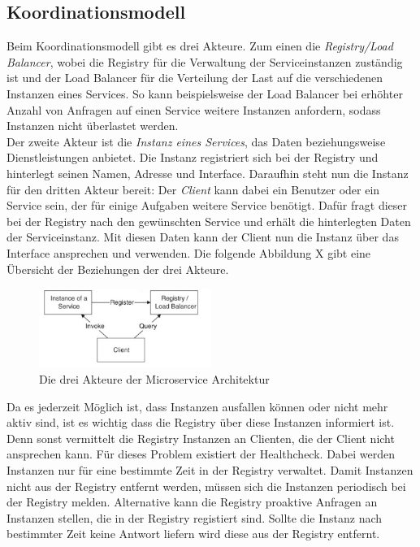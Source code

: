 \subsection{Koordinationsmodell}

Beim Koordinationsmodell gibt es drei Akteure. Zum einen die \textit{Registry/Load Balancer}, wobei die Registry für die Verwaltung der Serviceinstanzen zuständig ist und der Load Balancer für die Verteilung der Last auf die verschiedenen Instanzen eines Services. So kann beispielsweise der Load Balancer bei erhöhter Anzahl von Anfragen auf einen Service weitere Instanzen anfordern, sodass Instanzen nicht überlastet werden.\\
Der zweite Akteur ist die \textit{Instanz eines Services}, das Daten beziehungsweise Dienstleistungen anbietet. Die Instanz registriert sich bei der Registry und hinterlegt seinen Namen, Adresse und Interface. Daraufhin steht nun die Instanz für den dritten Akteur bereit: Der \textit{Client} kann dabei ein Benutzer oder ein Service sein, der für einige Aufgaben weitere Service benötigt. Dafür fragt dieser bei der Registry nach den gewünschten Service und erhält die hinterlegten Daten der Serviceinstanz. Mit diesen Daten kann der Client nun die Instanz über das Interface ansprechen und verwenden. Die folgende Abbildung X gibt eine Übersicht der Beziehungen der drei Akteure.

\begin{figure}[htbp]
  \centering
  \includegraphics[width=0.5\textwidth]{pictures/3akteure.png}
	\caption{Die drei Akteure der Microservice Architektur}
	\label{bService}
\end{figure}

Da es jederzeit Möglich ist, dass Instanzen ausfallen können oder nicht mehr aktiv sind, ist es wichtig dass die Registry über diese Instanzen informiert ist. Denn sonst vermittelt die Registry Instanzen an Clienten, die der Client nicht ansprechen kann. Für dieses Problem existiert der Healthcheck. Dabei werden Instanzen nur für eine bestimmte Zeit in der Registry verwaltet. Damit Instanzen nicht aus der Registry entfernt werden, müssen sich die Instanzen periodisch bei der Registry melden. Alternative kann die Registry proaktive Anfragen an Instanzen stellen, die in der Registry registiert sind. Sollte die Instanz nach bestimmter Zeit keine Antwort liefern wird diese aus der Registry entfernt.

